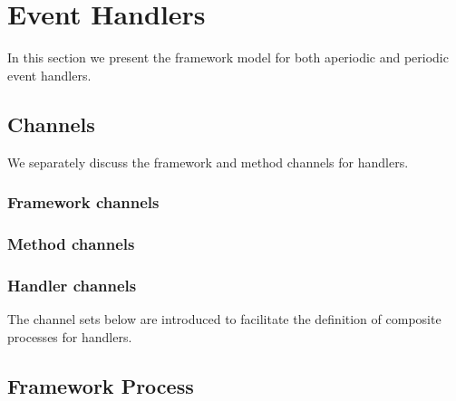 \documentclass{article}
\newcommand{\reducevspaceaftersection}{\vspace{-1em}}
\begin{document}
\newpage


\section{Event Handlers}

In this section we present the framework model for both aperiodic and periodic event handlers.

\subsection{Channels}

We separately discuss the framework and method channels for handlers.

\subsubsection*{Framework channels}
\reducevspaceaftersection



\subsubsection*{Method channels}
\reducevspaceaftersection



\subsubsection*{Handler channels}

The channel sets below are introduced to facilitate the definition of composite processes for handlers.
%
\begin{circusbox}

\end{circusbox}

\subsection{Framework Process}

\begin{circusbox}

\end{circusbox}
\end{document}
